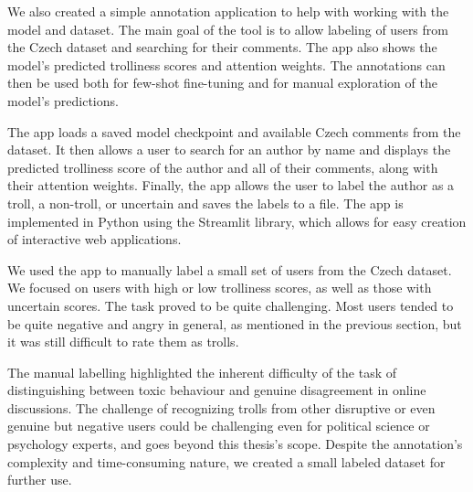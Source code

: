 \documentclass[twoside]{ctuthesis}
\theoremstyle{plain}
\theoremstyle{definition}
\theoremstyle{note}
\begin{document}
We also created a simple annotation application to help with working with the model and dataset. The main goal of the tool is to allow labeling of users from the Czech dataset and searching for their comments. The app also shows the model's predicted trolliness scores and attention weights. The annotations can then be used both for few-shot fine-tuning and for manual exploration of the model's predictions.\par
The app loads a saved model checkpoint and available Czech comments from the dataset. It then allows a user to search for an author by name and displays the predicted trolliness score of the author and all of their comments, along with their attention weights. Finally, the app allows the user to label the author as a troll, a non-troll, or uncertain and saves the labels to a file. The app is implemented in Python using the Streamlit library, which allows for easy creation of interactive web applications.\par
We used the app to manually label a small set of users from the Czech dataset. We focused on users with high or low trolliness scores, as well as those with uncertain scores. The task proved to be quite challenging. Most users tended to be quite negative and angry in general, as mentioned in the previous section, but it was still difficult to rate them as trolls. \par
The manual labelling highlighted the inherent difficulty of the task of distinguishing between toxic behaviour and genuine disagreement in online discussions. The challenge of recognizing trolls from other disruptive or even genuine but negative users could be challenging even for political science or psychology experts, and goes beyond this thesis's scope. Despite the annotation's complexity and time-consuming nature, we created a small labeled dataset for further use. \par
\end{document}
